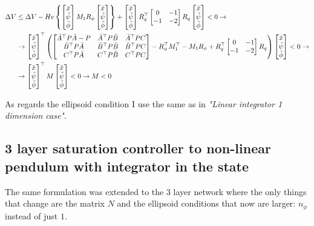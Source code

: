\documentclass{article}
\begin{document}
\begin{align*}
  \Delta V &\leq \Delta V - He \left\{\left[\begin{matrix}
    \tilde{x} \\
    \tilde{\psi} \\
    \tilde{\phi}
  \end{matrix}\right] M_{1} R_{\phi} \left[\begin{matrix}
    \tilde{x} \\
    \tilde{\psi} \\
    \tilde{\phi}
  \end{matrix}\right]\right\} + \left[\begin{matrix}
    \tilde{x} \\
    \tilde{\psi} \\
    \tilde{\phi}
  \end{matrix}\right] R_{q}^\top \left[\begin{matrix}
    0 & -1 \\
    -1 & -2
  \end{matrix}\right] R_{q} \left[\begin{matrix}
    \tilde{x} \\
    \tilde{\psi} \\
    \tilde{\phi}
  \end{matrix}\right] < 0 \to \\
  & \to \left[\begin{matrix}
    \tilde{x} \\
    \tilde{\psi} \\
    \tilde{\phi}
  \end{matrix}\right]^\top
  \left( \left[\begin{matrix}
    \bar{A}^\top P \bar{A} - P & \bar{A}^\top P \bar{B} & \bar{A}^\top P C \\
    \bar{B}^\top P \bar{A} & \bar{B}^\top P \bar{B} & \bar{B}^\top P C \\
    C^\top P \bar{A} & C^\top P \bar{B} & C^\top P C
  \end{matrix}\right] - R_{\phi} ^\top M_{1}^\top - M_{1} R_{\phi} + R_{q}^\top \left[\begin{matrix}
    0 & -1 \\
    -1 & -2
  \end{matrix}\right] R_{q}\right)
  \left[\begin{matrix}
    \tilde{x} \\
    \tilde{\psi} \\
    \tilde{\phi}
  \end{matrix}\right] < 0 \to \\
  & \to \left[\begin{matrix}
    \tilde{x} \\
    \tilde{\psi} \\
    \tilde{\phi}
  \end{matrix}\right]^\top
  M
  \left[\begin{matrix}
    \tilde{x} \\
    \tilde{\psi} \\
    \tilde{\phi}
  \end{matrix}\right] < 0 \to M < 0 
\end{align*}

As regards the ellipsoid condition I use the same as in \textit{"Linear integrator 1 dimension case"}.

\subsection*{3 layer saturation controller to non-linear pendulum with integrator in the state}

The same formulation was extended to the 3 layer network where the only things that change are the matrix $N$ and the ellipsoid conditions that now are larger: $n_{\phi}$ instead of just $1$.
\end{document}
